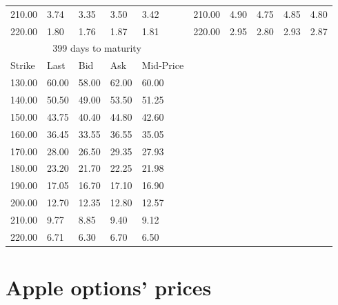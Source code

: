\documentclass[a4paper, 12pt]{report}
\begin{document}
\begin{appendices}
\begin{longtable}{|lllll|lllll|}
  210.00 & 3.74 & 3.35 & 3.50 & 3.42 &  210.00 & 4.90 & 4.75 & 4.85 & 4.80 \\*
  220.00 & 1.80 & 1.76 & 1.87 & 1.81 &  220.00 & 2.95 & 2.80 & 2.93 & 2.87 \\
  \hline
  \multicolumn{5}{|c|}{399 days to maturity} \\*
  \cline{1-5}
  Strike & Last & Bid & Ask & Mid-Price \\*
  \cline{1-5}
  130.00 & 60.00 & 58.00 & 62.00 & 60.00 \\*
  140.00 & 50.50 & 49.00 & 53.50 & 51.25 \\*
  150.00 & 43.75 & 40.40 & 44.80 & 42.60 \\*
  160.00 & 36.45 & 33.55 & 36.55 & 35.05 \\*
  170.00 & 28.00 & 26.50 & 29.35 & 27.93 \\*
  180.00 & 23.20 & 21.70 & 22.25 & 21.98 \\*
  190.00 & 17.05 & 16.70 & 17.10 & 16.90 \\*
  200.00 & 12.70 & 12.35 & 12.80 & 12.57 \\*
  210.00 & 9.77 & 8.85 & 9.40 & 9.12 \\*
  220.00 & 6.71 & 6.30 & 6.70 & 6.50 \\
  \cline{1-5}
\end{longtable}


\section{Apple options' prices}
\label{sec:appendix:option}


\end{appendices}
\end{document}
